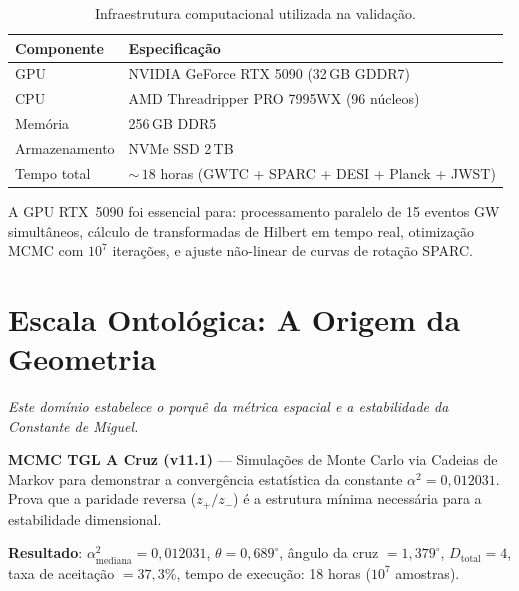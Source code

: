 \documentclass[12pt,a4paper,twoside]{article}
\newcommand{\alphaii}{\alpha^{2}}
\newcommand{\code}[1]{\texttt{#1}}
\begin{document}
\begin{table}[H]
\centering
\caption{Infraestrutura computacional utilizada na valida\c{c}\~ao.}
\label{tab:hardware}
\begin{tabular}{ll}
\toprule
\textbf{Componente} & \textbf{Especifica\c{c}\~ao} \\
\midrule
GPU & NVIDIA GeForce RTX 5090 (32\,GB GDDR7) \\
CPU & AMD Threadripper PRO 7995WX (96 n\'ucleos) \\
Mem\'oria & 256\,GB DDR5 \\
Armazenamento & NVMe SSD 2\,TB \\
Tempo total & ${\sim}\,18$ horas (GWTC + SPARC + DESI + Planck + JWST) \\
\bottomrule
\end{tabular}
\end{table}

\noindent A GPU RTX~5090 foi essencial para: processamento paralelo de 15 eventos GW simult\^aneos, c\'alculo de transformadas de Hilbert em tempo real, otimiza\c{c}\~ao MCMC com $10^7$ itera\c{c}\~oes, e ajuste n\~ao-linear de curvas de rota\c{c}\~ao SPARC.


\section{Escala Ontol\'ogica: A Origem da Geometria}


\noindent\textit{Este dom\'inio estabelece o porqu\^e da m\'etrica espacial e a estabilidade da Constante de Miguel.}

\begin{codebox}[title={Protocolo \#1 --- \code{TGL\_v11\_1\_CRUZ.py} (1\,684 linhas)}]
\textbf{MCMC TGL A Cruz (v11.1)} --- Simula\c{c}\~oes de Monte Carlo via Cadeias de Markov para demonstrar a converg\^encia estat\'istica da constante $\alphaii = 0{,}012031$. Prova que a paridade reversa ($z_+/z_-$) \'e a estrutura m\'inima necess\'aria para a estabilidade dimensional.

\medskip
\textbf{Resultado}: $\alphaii_{\text{mediana}} = 0{,}012031$, $\theta = 0{,}689^\circ{}$, \^angulo da cruz $= 1{,}379^\circ{}$, $D_{\text{total}} = 4$, taxa de aceita\c{c}\~ao $= 37{,}3\%$, tempo de execu\c{c}\~ao: 18 horas ($10^7$ amostras).
\end{codebox}
\end{document}
